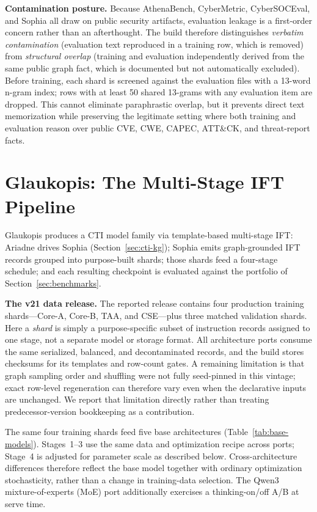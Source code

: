 \documentclass[conference]{IEEEtran}
\begin{document}
\textbf{Contamination posture.} Because AthenaBench, CyberMetric, CyberSOCEval, and Sophia all draw on public security artifacts, evaluation leakage is a first-order concern rather than an afterthought. The build therefore distinguishes \emph{verbatim contamination} (evaluation text reproduced in a training row, which is removed) from \emph{structural overlap} (training and evaluation independently derived from the same public graph fact, which is documented but not automatically excluded). Before training, each shard is screened against the evaluation files with a 13-word n-gram index; rows with at least 50 shared 13-grams with any evaluation item are dropped. This cannot eliminate paraphrastic overlap, but it prevents direct text memorization while preserving the legitimate setting where both training and evaluation reason over public CVE, CWE, CAPEC, ATT\&CK, and threat-report facts.

\section{Glaukopis: The Multi-Stage IFT Pipeline}
\label{sec:glaukopis}

Glaukopis produces a CTI model family via template-based multi-stage IFT: Ariadne drives Sophia (Section~\ref{sec:cti-kg}); Sophia emits graph-grounded IFT records grouped into purpose-built shards; those shards feed a four-stage schedule; and each resulting checkpoint is evaluated against the portfolio of Section~\ref{sec:benchmarks}.

\textbf{The v21 data release.} The reported release contains four production training shards---Core-A, Core-B, TAA, and CSE---plus three matched validation shards. Here a \emph{shard} is simply a purpose-specific subset of instruction records assigned to one stage, not a separate model or storage format. All architecture ports consume the same serialized, balanced, and decontaminated records, and the build stores checksums for its templates and row-count gates. A remaining limitation is that graph sampling order and shuffling were not fully seed-pinned in this vintage; exact row-level regeneration can therefore vary even when the declarative inputs are unchanged. We report that limitation directly rather than treating predecessor-version bookkeeping as a contribution.

The same four training shards feed five base architectures (Table~\ref{tab:base-models}). Stages~1--3 use the same data and optimization recipe across ports; Stage~4 is adjusted for parameter scale as described below. Cross-architecture differences therefore reflect the base model together with ordinary optimization stochasticity, rather than a change in training-data selection. The Qwen3 mixture-of-experts (MoE) port additionally exercises a thinking-on/off A/B at serve time.
\end{document}
